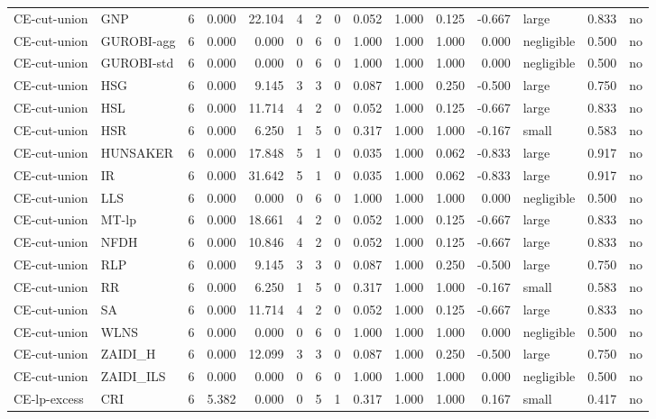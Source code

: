 \begin{table}[htbp]
\begin{tabular}{llrrrrrrrrrrlrr}
CE-cut-union & GNP & 6 & 0.000 & 22.104 & 4 & 2 & 0 & 0.052 & 1.000 & 0.125 & -0.667 & large & 0.833 & no \\
CE-cut-union & GUROBI-agg & 6 & 0.000 & 0.000 & 0 & 6 & 0 & 1.000 & 1.000 & 1.000 & 0.000 & negligible & 0.500 & no \\
CE-cut-union & GUROBI-std & 6 & 0.000 & 0.000 & 0 & 6 & 0 & 1.000 & 1.000 & 1.000 & 0.000 & negligible & 0.500 & no \\
CE-cut-union & HSG & 6 & 0.000 & 9.145 & 3 & 3 & 0 & 0.087 & 1.000 & 0.250 & -0.500 & large & 0.750 & no \\
CE-cut-union & HSL & 6 & 0.000 & 11.714 & 4 & 2 & 0 & 0.052 & 1.000 & 0.125 & -0.667 & large & 0.833 & no \\
CE-cut-union & HSR & 6 & 0.000 & 6.250 & 1 & 5 & 0 & 0.317 & 1.000 & 1.000 & -0.167 & small & 0.583 & no \\
CE-cut-union & HUNSAKER & 6 & 0.000 & 17.848 & 5 & 1 & 0 & 0.035 & 1.000 & 0.062 & -0.833 & large & 0.917 & no \\
CE-cut-union & IR & 6 & 0.000 & 31.642 & 5 & 1 & 0 & 0.035 & 1.000 & 0.062 & -0.833 & large & 0.917 & no \\
CE-cut-union & LLS & 6 & 0.000 & 0.000 & 0 & 6 & 0 & 1.000 & 1.000 & 1.000 & 0.000 & negligible & 0.500 & no \\
CE-cut-union & MT-lp & 6 & 0.000 & 18.661 & 4 & 2 & 0 & 0.052 & 1.000 & 0.125 & -0.667 & large & 0.833 & no \\
CE-cut-union & NFDH & 6 & 0.000 & 10.846 & 4 & 2 & 0 & 0.052 & 1.000 & 0.125 & -0.667 & large & 0.833 & no \\
CE-cut-union & RLP & 6 & 0.000 & 9.145 & 3 & 3 & 0 & 0.087 & 1.000 & 0.250 & -0.500 & large & 0.750 & no \\
CE-cut-union & RR & 6 & 0.000 & 6.250 & 1 & 5 & 0 & 0.317 & 1.000 & 1.000 & -0.167 & small & 0.583 & no \\
CE-cut-union & SA & 6 & 0.000 & 11.714 & 4 & 2 & 0 & 0.052 & 1.000 & 0.125 & -0.667 & large & 0.833 & no \\
CE-cut-union & WLNS & 6 & 0.000 & 0.000 & 0 & 6 & 0 & 1.000 & 1.000 & 1.000 & 0.000 & negligible & 0.500 & no \\
CE-cut-union & ZAIDI\_H & 6 & 0.000 & 12.099 & 3 & 3 & 0 & 0.087 & 1.000 & 0.250 & -0.500 & large & 0.750 & no \\
CE-cut-union & ZAIDI\_ILS & 6 & 0.000 & 0.000 & 0 & 6 & 0 & 1.000 & 1.000 & 1.000 & 0.000 & negligible & 0.500 & no \\
CE-lp-excess & CRI & 6 & 5.382 & 0.000 & 0 & 5 & 1 & 0.317 & 1.000 & 1.000 & 0.167 & small & 0.417 & no \\

\end{tabular}
\end{table}
